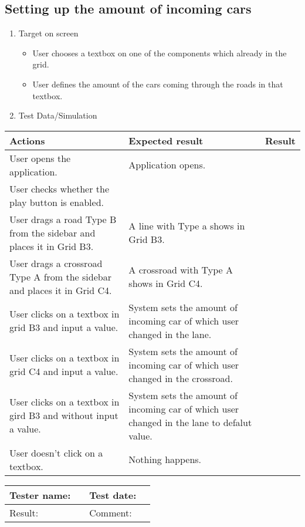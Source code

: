 \newpage

\subsection{Setting up the amount of incoming cars }

\begin{enumerate}
	
	\item Target on screen
	\begin{itemize}
		\item User chooses a textbox on one of the components which already in the grid.
		\item User defines the amount of the cars coming through the roads in that textbox.
	\end{itemize}
	\item Test Data/Simulation
\end{enumerate}	
	\begin{tabularx}{\textwidth}{|X|X|p{2.5cm}|}\hline
		Actions & Expected result & Result \\\hline
		User opens the application.& Application opens. &  \pass \\\hline
		User checks whether the play button is enabled. & &  \pass \\\hline
		User drags a road Type B from the sidebar and places it in Grid B3. & A line with Type a shows in Grid B3. & \pass \\\hline
		User drags a crossroad Type A from the sidebar and places it in Grid C4. & A crossroad with Type A shows in Grid C4. & \pass \\\hline
		User clicks on a textbox in grid B3 and input a value. & System sets the amount of incoming car of which user changed in the lane. & \pass \\\hline
		User clicks on a textbox in grid C4 and input a value. & System sets the amount of incoming car of which user changed in the crossroad. & \pass \\\hline
		User clicks on a textbox in gird B3 and without input a value. & System sets the amount of incoming car of which user changed in the lane to defalut value. & \pass \\\hline
		User doesn't click on a textbox. & Nothing happens. &  \pass \\\hline
	\end{tabularx}
	

\begin{tabularx}{\textwidth}{|p{3cm}X|p{3cm}X|}\hline
	Tester name: &  & Test date: & \\\hline
	Result: &   \pass & Comment: & \\\hline
\end{tabularx}

